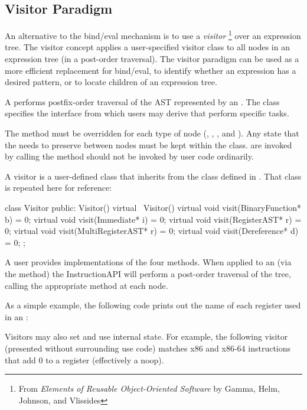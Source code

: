 \subsection{Visitor Paradigm}\label{sec:visitor}

An alternative to the bind/eval mechanism is to use a \emph{visitor}
\footnote{From \emph{Elements of Reusable Object-Oriented Software} by
  Gamma, Helm, Johnson, and Vlissides}
over an expression tree. The visitor concept applies a user-specified
visitor class to all nodes in an expression tree (in a post-order
traversal). The visitor paradigm can be used as a more efficient
replacement for bind/eval, to identify whether an expression has a
desired pattern, or to locate children of an expression tree.

A  performs postfix-order traversal of the AST represented by
an .  The  class specifies the interface from which
users may derive  that perform specific tasks.

The  method must be overridden for each type of  node
(, , , and ).  Any state that
the  needs to preserve between nodes must be kept within the class.
 are invoked by calling  the  method
should not be invoked by user code ordinarily.

A visitor is a user-defined class that inherits from the
 class defined in . That class is
repeated here for reference:

\begin{apient}
class Visitor {
  public:
    Visitor() {}
    virtual ~Visitor() {}
    virtual void visit(BinaryFunction* b) = 0;
    virtual void visit(Immediate* i) = 0;
    virtual void visit(RegisterAST* r) = 0;
    virtual void visit(MultiRegisterAST* r) = 0;
    virtual void visit(Dereference* d) = 0;
};
\end{apient}

A user provides implementations of the four  methods. When
applied to an  (via the 
method) the InstructionAPI will perform a post-order traversal of the
tree, calling the appropriate  method at each node. 

As a simple example, the following code prints out the name of each
register used in an :

\lstset{language=[GNU]C++,basicstyle=\ttfamily\selectfont\small}
\lstset{numbers=none}


Visitors may also set and use internal state. For example, the
following visitor (presented without surrounding use code) matches x86
and x86-64 instructions that add 0 to a register (effectively a
noop). 


